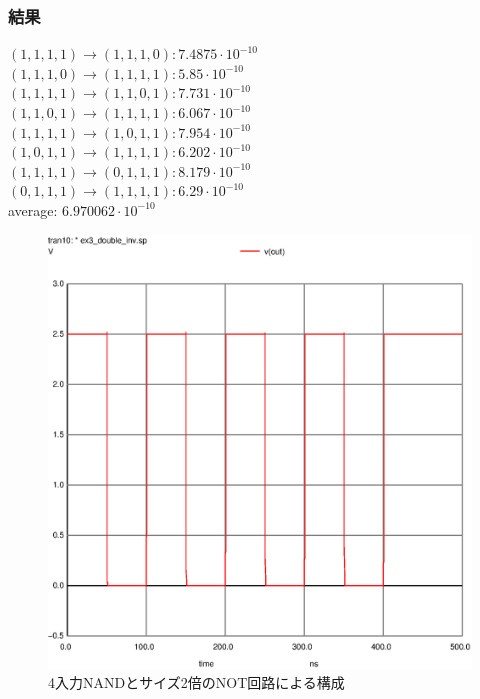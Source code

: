 \documentclass{jsarticle}
\begin{document}
\subsubsection{結果}
\begin{flushleft}
$(1,1,1,1) \rightarrow (1,1,1,0) : 7.4875 \cdot 10^{-10}$\\
$(1,1,1,0) \rightarrow (1,1,1,1) : 5.85 \cdot 10^{-10}$\\
$(1,1,1,1) \rightarrow (1,1,0,1) : 7.731 \cdot 10^{-10}$\\
$(1,1,0,1) \rightarrow (1,1,1,1) : 6.067 \cdot 10^{-10}$\\
$(1,1,1,1) \rightarrow (1,0,1,1) : 7.954 \cdot 10^{-10}$\\
$(1,0,1,1) \rightarrow (1,1,1,1) : 6.202 \cdot 10^{-10}$\\
$(1,1,1,1) \rightarrow (0,1,1,1) : 8.179 \cdot 10^{-10}$\\
$(0,1,1,1) \rightarrow (1,1,1,1) : 6.29 \cdot 10^{-10}$\\
average: $6.970062 \cdot 10^{-10}$

\end{flushleft}
\begin{figure}[H]
    \hspace{50pt}
    \includegraphics[scale=0.8]{ex3_double_inv.ps}
    \vspace{30pt}
    \caption{4入力NANDとサイズ2倍のNOT回路による構成}
\end{figure}
\end{document}
